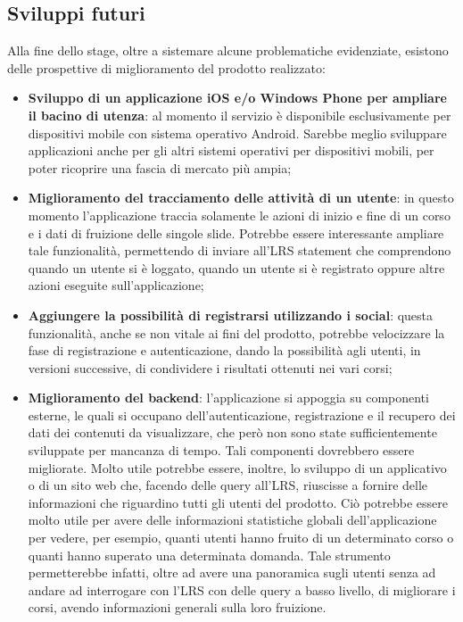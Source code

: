 \documentclass[../Tesi.tex]{subfiles}
\begin{document}
	\subsection{Sviluppi futuri}
	Alla fine dello stage, oltre a sistemare alcune problematiche evidenziate, esistono delle prospettive di miglioramento del prodotto realizzato:
	\begin{itemize}
		\item \textbf{Sviluppo di un applicazione iOS e/o Windows Phone per ampliare il bacino di utenza}: al momento il servizio è disponibile esclusivamente per dispositivi mobile con sistema operativo Android. Sarebbe meglio sviluppare applicazioni anche per gli altri sistemi operativi per dispositivi mobili, per poter ricoprire una fascia di mercato più ampia;
		\item \textbf{Miglioramento del tracciamento delle attività di un utente}: in questo momento l'applicazione traccia solamente le azioni di inizio e fine di un corso e i dati di fruizione delle singole slide. Potrebbe essere interessante ampliare tale funzionalità, permettendo di inviare all'LRS statement che comprendono quando un utente si è loggato, quando un utente si è registrato oppure altre azioni eseguite sull'applicazione;
		\item \textbf{Aggiungere la possibilità di registrarsi utilizzando i social}: questa funzionalità, anche se non vitale ai fini del prodotto, potrebbe velocizzare la fase di registrazione e autenticazione, dando la possibilità agli utenti, in versioni successive, di condividere i risultati ottenuti nei vari corsi;
		\item \textbf{Miglioramento del backend}: l'applicazione si appoggia su componenti esterne, le quali si occupano dell'autenticazione, registrazione e il recupero dei dati dei contenuti da visualizzare, che però non sono state sufficientemente sviluppate per mancanza di tempo. Tali componenti dovrebbero essere migliorate. Molto utile potrebbe essere, inoltre, lo sviluppo di un applicativo o di un sito web che, facendo delle query all'LRS, riuscisse a fornire delle informazioni che riguardino tutti gli utenti del prodotto. Ciò potrebbe essere molto utile per avere delle informazioni statistiche globali dell'applicazione per vedere, per esempio, quanti utenti hanno fruito di un determinato corso o quanti hanno superato una determinata domanda. Tale strumento permetterebbe infatti, oltre ad avere una panoramica sugli utenti senza ad andare ad interrogare con l'LRS con delle query a basso livello, di migliorare i corsi, avendo informazioni generali sulla loro fruizione.
	\end{itemize}
\end{document}

